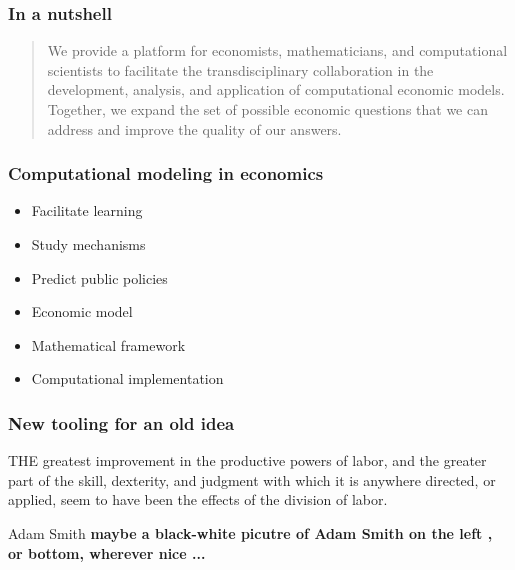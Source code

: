 \begin{frame}\frametitle{In a nutshell}
\hspace{1.5cm}
\begin{quote}\Large
	We provide a platform for economists, mathematicians, and computational scientists to facilitate the transdisciplinary collaboration in the development, analysis, and application of computational economic models. Together, we expand the set of possible economic questions that we can address and improve the quality of our	answers.
\end{quote}


\end{frame}
\begin{frame}\frametitle{Computational modeling in economics}

	\begin{multicols}{2}
	\vspace{0.3cm}
	\begin{itemize}\setlength\itemsep{1em}
	\item Facilitate learning
	\item Study mechanisms
	\item Predict public policies
	\end{itemize}

	\pause

  \vspace{0.3cm}
	\begin{itemize}\setlength\itemsep{1em}
	\item Economic model
	\item Mathematical framework
	\item Computational implementation
	\end{itemize}
	\end{multicols}

\end{frame}

\begin{frame}\frametitle{New tooling for an old idea}

THE greatest improvement in the productive powers of labor, and the greater part of the skill, dexterity, and judgment with which it is anywhere directed, or applied, seem to have been the effects of the division of labor.


Adam Smith
\textbf{maybe a black-white picutre of Adam Smith on the left , or bottom, wherever nice ...}

\end{frame}

